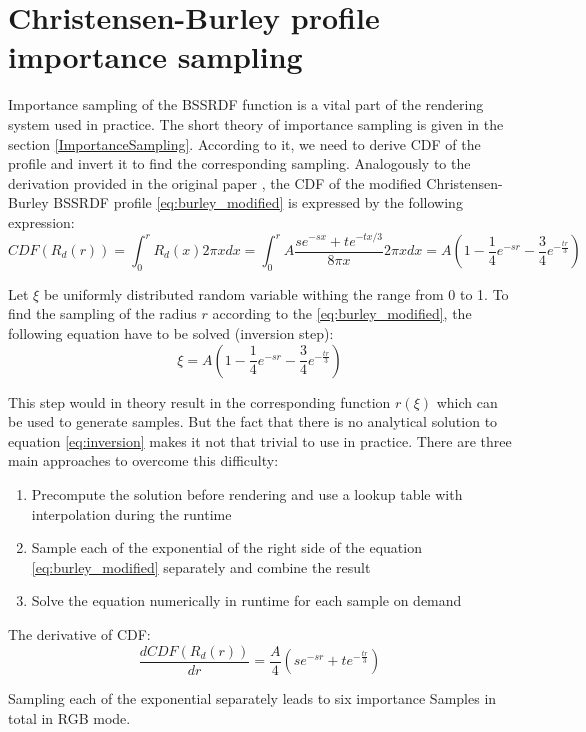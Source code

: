 \section{Christensen-Burley profile importance sampling}
\label{section:burley_importance}

Importance sampling of the BSSRDF function is a vital part of the
rendering system used in practice. The short theory of importance sampling is given in the section
\ref{ImportanceSampling}. According to it, we need to derive \gls{CDF} of the profile and invert it to find
the corresponding sampling. Analogously to the derivation provided in the original paper
\cite{Christensen:2015:ARP:2775280.2792555}, the \gls{CDF} of the modified Christensen-Burley
\gls{BSSRDF} profile \ref{eq:burley_modified} is expressed by the following expression:
\[
\label{eq:burley_cdf}
CDF(R_d(r)) = \int_{0}^{r} R_d(x)2\pi xdx = \int_{0}^{r} A\frac{s e^{-sx}+t e^{-tx/3}}{8\pi x}2\pi
xdx = A(1-\frac{1}{4}e^{-sr}-\frac{3}{4}e^{-\frac{tr}{3}})
\]

Let $\xi$ be uniformly distributed random variable withing the range from 0 to 1. To find the
sampling of the radius $r$ according to the \ref{eq:burley_modified}, the following equation have to
be solved (inversion step):
\begin{equation}
\label{eq:inversion}
\xi=A(1-\frac{1}{4}e^{-sr}-\frac{3}{4}e^{-\frac{tr}{3}})
\end{equation}

This step would in theory result in the corresponding function $r(\xi)$ which can be used to
generate samples. But the fact that there is no analytical solution to equation
\ref{eq:inversion} makes it not that trivial to use in practice.
There are three main approaches to overcome this difficulty:
\begin{enumerate}
  \item Precompute the solution before rendering and use a lookup table with interpolation
  during the runtime
  \item Sample each of the exponential of the right side of the equation \ref{eq:burley_modified}
  separately and combine the result
  \item Solve the equation numerically in runtime for each sample on demand
\end{enumerate}

The derivative of CDF:
\[
\frac{dCDF(R_d(r))}{dr} = \frac{A}{4}(se^{-sr}+te^{-\frac{tr}{3}})
\]

Sampling each of the exponential separately leads to six importance Samples in
total in RGB mode.

